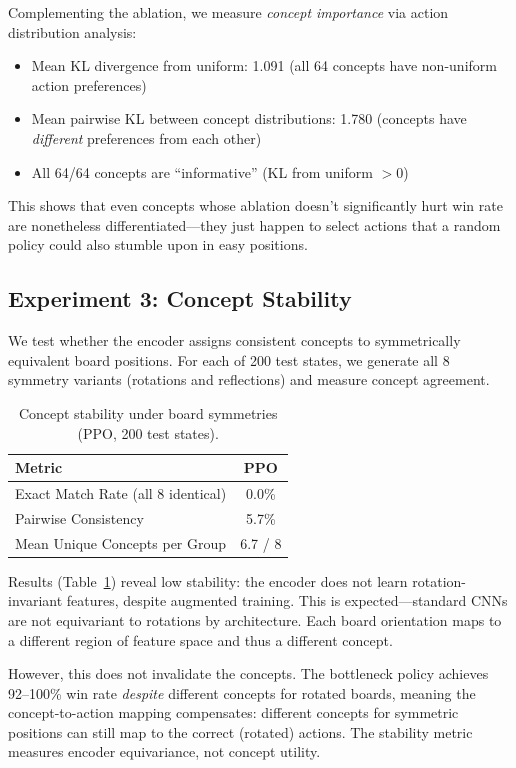 \documentclass[11pt,a4paper]{article}
\begin{document}
Complementing the ablation, we measure \emph{concept importance} via action distribution analysis:
\begin{itemize}[leftmargin=*]
    \item Mean KL divergence from uniform: 1.091 (all 64 concepts have non-uniform action preferences)
    \item Mean pairwise KL between concept distributions: 1.780 (concepts have \emph{different} preferences from each other)
    \item All 64/64 concepts are ``informative'' (KL from uniform $> 0$)
\end{itemize}

This shows that even concepts whose ablation doesn't significantly hurt win rate are nonetheless differentiated---they just happen to select actions that a random policy could also stumble upon in easy positions.

\subsection{Experiment 3: Concept Stability}
\label{sec:stability}

We test whether the encoder assigns consistent concepts to symmetrically equivalent board positions. For each of 200 test states, we generate all 8 symmetry variants (rotations and reflections) and measure concept agreement.

\begin{table}[t]
\centering
\caption{Concept stability under board symmetries (PPO, 200 test states).}
\label{tab:stability}
\begin{tabular}{lc}
\toprule
\textbf{Metric} & \textbf{PPO} \\
\midrule
Exact Match Rate (all 8 identical) & 0.0\% \\
Pairwise Consistency               & 5.7\% \\
Mean Unique Concepts per Group      & 6.7 / 8 \\
\bottomrule
\end{tabular}
\end{table}

Results (Table~\ref{tab:stability}) reveal low stability: the encoder does not learn rotation-invariant features, despite augmented training. This is expected---standard CNNs are not equivariant to rotations by architecture. Each board orientation maps to a different region of feature space and thus a different concept.

However, this does not invalidate the concepts. The bottleneck policy achieves 92--100\% win rate \emph{despite} different concepts for rotated boards, meaning the concept-to-action mapping compensates: different concepts for symmetric positions can still map to the correct (rotated) actions. The stability metric measures encoder equivariance, not concept utility.
\end{document}
